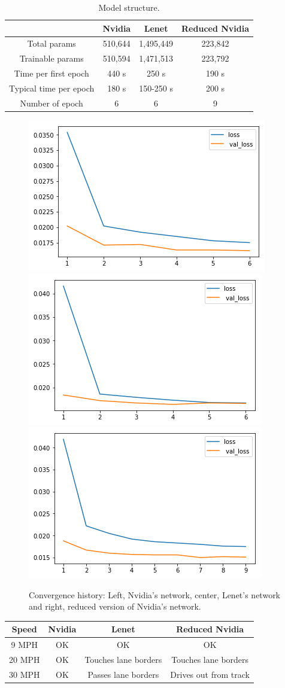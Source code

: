 \documentclass[12pt,a4paper]{article}
\begin{document}
\begin{table}[H]
	\centering
	\begin{tabular}{|c|c|c|c|}
		\hline 
		&Nvidia  &Lenet  &Reduced Nvidia  \\ 
		\hline 
		Total params &   510,644& 1,495,449 & 223,842 \\ 
		\hline 
		Trainable params & 510,594 & 1,471,513 & 223,792\\ 
		\hline 
		Time per first epoch &  440 s& 250 s & 190 s\\ 
		\hline 
		Typical time per epoch & 180 s & 150-250 s & 200 s\\ 
		\hline 
		Number of epoch& 6 & 6  & 9 \\ 
		\hline 
	\end{tabular}
	\caption{Model structure.}
	\label{fig:table1}
\end{table}


\begin{figure}[H]
	\centering
	\includegraphics[width=0.3\linewidth]{writeup_figures/nvidia_loss}
	\includegraphics[width=0.3\linewidth]{writeup_figures/lenet_loss}		\includegraphics[width=0.3\linewidth]{writeup_figures/nvidia_reduced_loss}
	\caption{Convergence history: Left, Nvidia's network, center, Lenet's network and right, reduced version of Nvidia's network.}
	\label{fig:models}
\end{figure}

\begin{tabular}{|c|c|c|c|}
	\hline 
	Speed &Nvidia  &Lenet  &Reduced Nvidia  \\ 
	\hline 
	9 MPH  &   OK& OK & OK \\ 
	\hline 
	20 MPH& OK & Touches lane borders & Touches lane borders\\ 
	\hline 
	30 MPH&  OK& Passes lane borders & Drives out from track\\ 
	\hline  
\end{tabular} 
\end{document}
